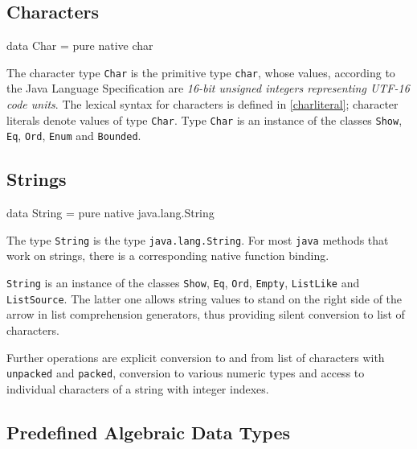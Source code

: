 \subsection{Characters}  

\begin{code}
data Char = pure native char
\end{code}

The character type \texttt{Char} is the primitive \java{} type \texttt{char}, 
whose values, according to the Java Language Specification are 
\emph{16-bit unsigned integers representing UTF-16 code units}.
The lexical syntax for characters is defined in \autoref{charliteral}; 
character literals denote values of type \texttt{Char}.
Type \texttt{Char} is an instance of the classes \texttt{Show}, \texttt{Eq}, \texttt{Ord}, \texttt{Enum} and \texttt{Bounded}.


\subsection{Strings} 

\begin{code}
data String = pure native java.lang.String
\end{code}

The type \texttt{String} is the \java{} type \texttt{java.lang.String}.
For most \texttt{java} methods that work on strings, there is a corresponding native function binding.

\texttt{String} is an instance of the classes 
\texttt{Show}, \texttt{Eq}, \texttt{Ord}, \texttt{Empty}, \texttt{ListLike} and \texttt{ListSource}. 
The latter one allows string values to stand on the right side of the arrow in list comprehension generators, 
thus providing silent conversion to list of characters.

Further operations are explicit conversion to and from list of characters with \texttt{unpacked} and \texttt{packed}, 
conversion to various numeric types and access to individual characters of a string with integer indexes.


\subsection{Predefined Algebraic Data Types} 


